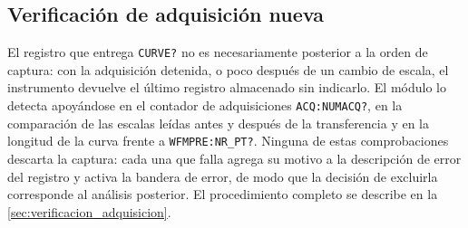 
\subsection*{Verificación de adquisición nueva}

El registro que entrega \texttt{CURVE?} no es necesariamente posterior a la orden de captura: con la adquisición detenida, o poco después de un cambio de escala, el instrumento devuelve el último registro almacenado sin indicarlo. El módulo lo detecta apoyándose en el contador de adquisiciones \texttt{ACQ:NUMACQ?}, en la comparación de las escalas leídas antes y después de la transferencia y en la longitud de la curva frente a \texttt{WFMPRE:NR\_PT?}. Ninguna de estas comprobaciones descarta la captura: cada una que falla agrega su motivo a la descripción de error del registro y activa la bandera de error, de modo que la decisión de excluirla corresponde al análisis posterior. El procedimiento completo se describe en la \cref{sec:verificacion_adquisicion}.

